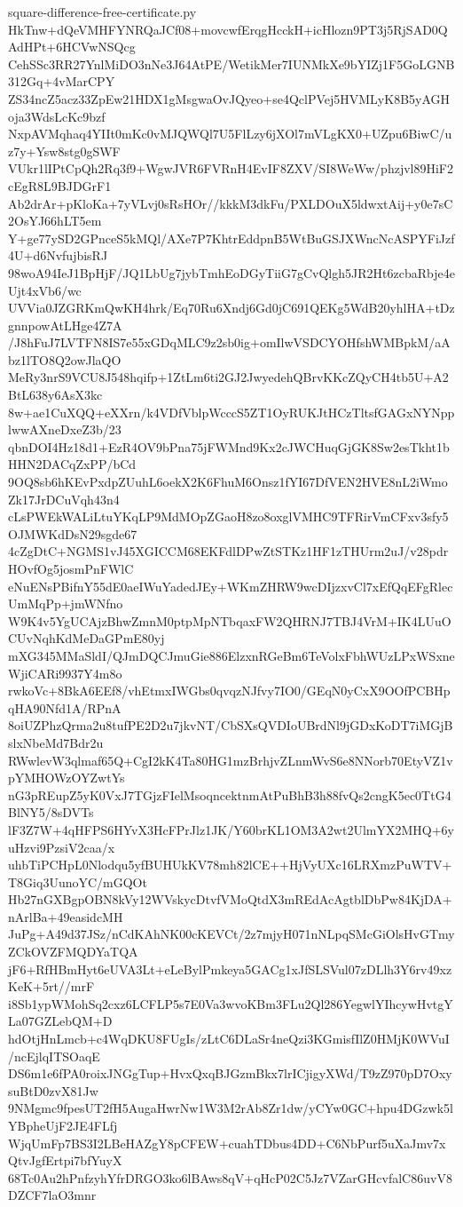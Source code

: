 \documentclass[11pt]{article}
\theoremstyle{definition}
\theoremstyle{remark}
\begin{document}
\begin{filecontents*}[overwrite]{square-difference-free-certificate.py}
HkTnw+dQeVMHFYNRQaJCf08+movcwfErqgHcckH+icHlozn9PT3j5RjSAD0QAdHPt+6HCVwNSQcg
CehSSc3RR27YnlMiDO3nNe3J64AtPE/WetikMer7IUNMkXe9bYIZj1F5GoLGNB312Gq+4vMarCPY
ZS34ncZ5acz33ZpEw21HDX1gMsgwaOvJQyeo+se4QclPVej5HVMLyK8B5yAGHoja3WdsLcKc9bzf
NxpAVMqhaq4YIIt0mKc0vMJQWQl7U5FlLzy6jXOl7mVLgKX0+UZpu6BiwC/uz7y+Ysw8stg0gSWF
VUkr1lIPtCpQh2Rq3f9+WgwJVR6FVRnH4EvIF8ZXV/SI8WeWw/phzjvl89HiF2cEgR8L9BJDGrF1
Ab2drAr+pKloKa+7yVLvj0sRsHOr//kkkM3dkFu/PXLDOuX5ldwxtAij+y0e7sC2OsYJ66hLT5em
Y+ge77ySD2GPnceS5kMQl/AXe7P7KhtrEddpnB5WtBuGSJXWncNcASPYFiJzf4U+d6NvfujbisRJ
98woA94IeJ1BpHjF/JQ1LbUg7jybTmhEoDGyTiiG7gCvQlgh5JR2Ht6zcbaRbje4eUjt4xVb6/wc
UVVia0JZGRKmQwKH4hrk/Eq70Ru6Xndj6Gd0jC691QEKg5WdB20yhlHA+tDzgnnpowAtLHge4Z7A
/J8hFuJ7LVTFN8IS7e55xGDqMLC9z2sb0ig+omIlwVSDCYOHfshWMBpkM/aAbz1lTO8Q2owJlaQO
MeRy3nrS9VCU8J548hqifp+1ZtLm6ti2GJ2JwyedehQBrvKKcZQyCH4tb5U+A2BtL638y6AsX3kc
8w+ae1CuXQQ+eXXrn/k4VDfVblpWcccS5ZT1OyRUKJtHCzTltsfGAGxNYNpplwwAXneDxeZ3b/23
qbnDOI4Hz18d1+EzR4OV9bPna75jFWMnd9Kx2cJWCHuqGjGK8Sw2esTkht1bHHN2DACqZxPP/bCd
9OQ8sb6hKEvPxdpZUuhL6oekX2K6FhuM6Onsz1fYI67DfVEN2HVE8nL2iWmoZk17JrDCuVqh43n4
cLsPWEkWALiLtuYKqLP9MdMOpZGaoH8zo8oxglVMHC9TFRirVmCFxv3sfy5OJMWKdDsN29sgde67
4cZgDtC+NGMS1vJ45XGICCM68EKFdlDPwZtSTKz1HF1zTHUrm2uJ/v28pdrHOvfOg5josmPnFWlC
eNuENsPBifnY55dE0aeIWuYadedJEy+WKmZHRW9wcDIjzxvCl7xEfQqEFgRlecUmMqPp+jmWNfno
W9K4v5YgUCAjzBhwZmnM0ptpMpNTbqaxFW2QHRNJ7TBJ4VrM+IK4LUuOCUvNqhKdMeDaGPmE80yj
mXG345MMaSldI/QJmDQCJmuGie886ElzxnRGeBm6TeVolxFbhWUzLPxWSxneWjiCARi9937Y4m8o
rwkoVc+8BkA6EEf8/vhEtmxIWGbs0qvqzNJfvy7IO0/GEqN0yCxX9OOfPCBHpqHA90Nfd1A/RPnA
8oiUZPhzQrma2u8tufPE2D2u7jkvNT/CbSXsQVDIoUBrdNl9jGDxKoDT7iMGjBslxNbeMd7Bdr2u
RWwlevW3qlmaf65Q+CgI2kK4Ta80HG1mzBrhjvZLnmWvS6e8NNorb70EtyVZ1vpYMHOWzOYZwtYs
nG3pREupZ5yK0VxJ7TGjzFIelMsoqncektnmAtPuBhB3h88fvQs2cngK5ec0TtG4BlNY5/8sDVTs
lF3Z7W+4qHFPS6HYvX3HcFPrJlz1JK/Y60brKL1OM3A2wt2UlmYX2MHQ+6yuHzvi9PzsiV2caa/x
uhbTiPCHpL0Nlodqu5yfBUHUkKV78mh82lCE++HjVyUXc16LRXmzPuWTV+T8Giq3UunoYC/mGQOt
Hb27nGXBgpOBN8kVy12WVskycDtvfVMoQtdX3mREdAcAgtblDbPw84KjDA+nArlBa+49easidcMH
JuPg+A49d37JSz/nCdKAhNK00cKEVCt/2z7mjyH071nNLpqSMcGiOlsHvGTmyZCkOVZFMQDYaTQA
jF6+RfHBmHyt6eUVA3Lt+eLeBylPmkeya5GACg1xJfSLSVul07zDLlh3Y6rv49xzKeK+5rt//mrF
i8Sb1ypWMohSq2cxz6LCFLP5s7E0Va3wvoKBm3FLu2Ql286YegwlYIhcywHvtgYLa07GZLebQM+D
hdOtjHnLmcb+c4WqDKU8FUgIs/zLtC6DLaSr4neQzi3KGmisfIlZ0HMjK0WVuI/ncEjlqITSOaqE
DS6m1e6fPA0roixJNGgTup+HvxQxqBJGzmBkx7lrICjigyXWd/T9zZ970pD7OxysuBtD0zvX81Jw
9NMgmc9fpesUT2fH5AugaHwrNw1W3M2rAb8Zr1dw/yCYw0GC+hpu4DGzwk5lYBpheUjF2JE4FLfj
WjqUmFp7BS3I2LBeHAZgY8pCFEW+cuahTDbus4DD+C6NbPurf5uXaJmv7xQtvJgfErtpi7bfYuyX
68Tc0Au2hPnfzyhYfrDRGO3ko6lBAws8qV+qHcP02C5Jz7VZarGHcvfalC86uvV8DZCF7laO3mnr

\end{filecontents*}
\end{document}
